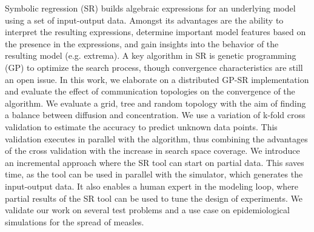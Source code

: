 
Symbolic regression (SR) builds algebraic expressions for an underlying model using a set of input-output data.
Amongst its advantages are the ability to interpret the resulting expressions, determine important model features based on the presence in the expressions, and gain insights into the behavior of the resulting model (e.g. extrema). A key algorithm in SR is genetic programming (GP) to optimize the search process, though convergence characteristics are still an open issue.
In this work, we elaborate on a distributed GP-SR implementation and evaluate the effect of communication topologies on the convergence of the algorithm.
We evaluate a grid, tree and random topology with the aim of finding a balance between diffusion and concentration.
We use a variation of k-fold cross validation to estimate the accuracy to predict unknown data points. This validation executes in parallel with the algorithm, thus combining the advantages of the cross validation with the increase in search space coverage. We introduce an incremental approach where the SR tool can start on partial data. This saves time, as the tool can be used in parallel with the simulator, which generates the input-output data. It also enables a human expert in the modeling loop, where partial results of the SR tool can be used to tune the design of experiments. We validate our work on several test problems and a use case on epidemiological simulations for the spread of measles.